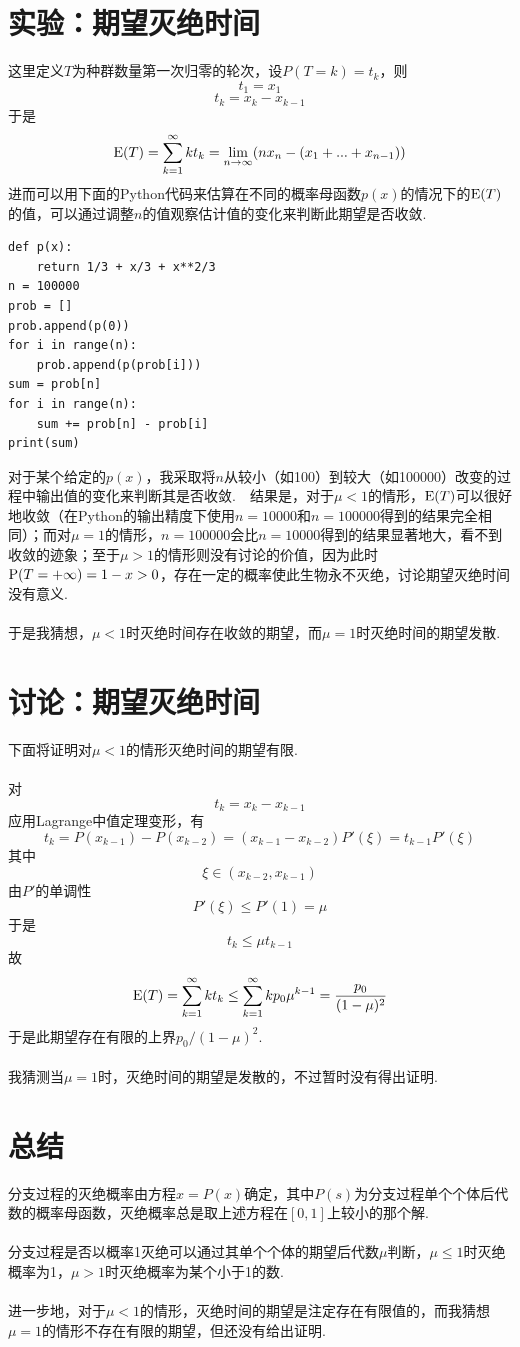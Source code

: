 \documentclass{article}
\begin{document}
\begin{CJK}{UTF8}{gbsn}
\section{实验：期望灭绝时间}
这里定义$T$为种群数量第一次归零的轮次，设$P(T=k)=t_k$，则
$$ t_1 = x_1 $$
$$ t_k = x_k-x_{k-1} $$
于是
$$ {\rm E}(T)=\sum\limits_{k=1}^{\infty}kt_k=\lim_{n\to\infty}(nx_n-(x_1+...+x_{n-1})) $$
进而可以用下面的Python代码来估算在不同的概率母函数$p(x)$的情况下的${\rm E}(T)$的值，可以通过调整$n$的值观察估计值的变化来判断此期望是否收敛.
\begin{center}
    \lstset{language=Python}
    \begin{lstlisting}
def p(x):
    return 1/3 + x/3 + x**2/3
n = 100000
prob = []
prob.append(p(0))
for i in range(n):
    prob.append(p(prob[i]))
sum = prob[n]
for i in range(n):
    sum += prob[n] - prob[i]
print(sum)
    \end{lstlisting}
\end{center}
对于某个给定的$p(x)$，我采取将$n$从较小（如100）到较大（如100000）改变的过程中输出值的变化来判断其是否收敛.\ \ 结果是，对于$\mu<1$的情形，${\rm E}(T)$可以很好地收敛（在Python的输出精度下使用$n=10000$和$n=100000$得到的结果完全相同）；而对$\mu=1$的情形，$n=100000$会比$n=10000$得到的结果显著地大，看不到收敛的迹象；至于$\mu>1$的情形则没有讨论的价值，因为此时${\rm P}(T=+\infty)=1-x>0$，存在一定的概率使此生物永不灭绝，讨论期望灭绝时间没有意义.
\\\\
于是我猜想，$\mu<1$时灭绝时间存在收敛的期望，而$\mu=1$时灭绝时间的期望发散.
\section{讨论：期望灭绝时间}
下面将证明对$\mu<1$的情形灭绝时间的期望有限.
\\\\
对
$$ t_k=x_k-x_{k-1} $$
应用Lagrange中值定理变形，有
$$ t_k=P(x_{k-1})-P(x_{k-2})=(x_{k-1}-x_{k-2})P'(\xi)=t_{k-1}P'(\xi) $$
其中
$$ \xi\in (x_{k-2},x_{k-1}) $$
由$P'$的单调性
$$ P'(\xi)\leq P'(1)=\mu $$
于是
$$ t_k\leq \mu t_{k-1} $$
故
$$ {\rm E}(T)=\sum\limits_{k=1}^{\infty}kt_k\leq \sum\limits_{k=1}^{\infty}kp_0\mu^{k-1}=\frac{p_0}{(1-\mu)^{2}} $$
于是此期望存在有限的上界$p_0/(1-\mu)^{2}$.
\\\\
我猜测当$\mu=1$时，灭绝时间的期望是发散的，不过暂时没有得出证明.
\section{总结}
分支过程的灭绝概率由方程$x=P(x)$确定，其中$P(s)$为分支过程单个个体后代数的概率母函数，灭绝概率总是取上述方程在$[0,1]$上较小的那个解.
\\\\
分支过程是否以概率1灭绝可以通过其单个个体的期望后代数$\mu$判断，$\mu\leq 1$时灭绝概率为1，$\mu>1$时灭绝概率为某个小于1的数.
\\\\
进一步地，对于$\mu<1$的情形，灭绝时间的期望是注定存在有限值的，而我猜想$\mu=1$的情形不存在有限的期望，但还没有给出证明.

\end{CJK}
\end{document}
